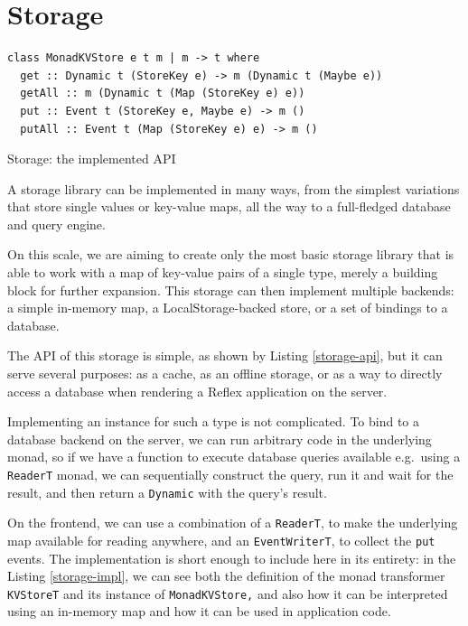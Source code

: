 \documentclass[english,zadani,odsaz]{fitthesis}
\begin{document}
\section{Storage}
\label{sec:orgca77606}
\begin{listing}[!b]
\begin{verbatim}
class MonadKVStore e t m | m -> t where
  get :: Dynamic t (StoreKey e) -> m (Dynamic t (Maybe e))
  getAll :: m (Dynamic t (Map (StoreKey e) e))
  put :: Event t (StoreKey e, Maybe e) -> m ()
  putAll :: Event t (Map (StoreKey e) e) -> m ()
\end{verbatim}
\caption{Storage: the implemented API \label{storage-api}}
\end{listing}

A storage library can be implemented in many ways, from the simplest variations
that store single values or key-value maps, all the way to a full-fledged
database and query engine.

On this scale, we are aiming to create only the most basic storage library that
is able to work with a map of key-value pairs of a single type, merely a
building block for further expansion. This storage can then implement multiple
backends: a simple in-memory map, a LocalStorage-backed store, or a set of
bindings to a database.

The API of this storage is simple, as shown by Listing \ref{storage-api}, but it
can serve several purposes: as a cache, as an offline storage, or as a way to
directly access a database when rendering a Reflex application on the server.

Implementing an instance for such a type is not complicated. To bind to a
database backend on the server, we can run arbitrary code in the underlying
monad, so if we have a function to execute database queries available
e.g.~using a \texttt{ReaderT} monad, we can sequentially construct the query, run
it and wait for the result, and then return a \texttt{Dynamic} with the query's result.

On the frontend, we can use a combination of a \texttt{ReaderT}, to make the underlying
map available for reading anywhere, and an \texttt{EventWriterT}, to collect the \texttt{put}
events. The implementation is short enough to include here in its entirety: in
the Listing \ref{storage-impl}, we can see both the definition of the monad
transformer \texttt{KVStoreT} and its instance of \texttt{MonadKVStore,} and also how it can be
interpreted using an in-memory map and how it can be used in application code.
\end{document}
